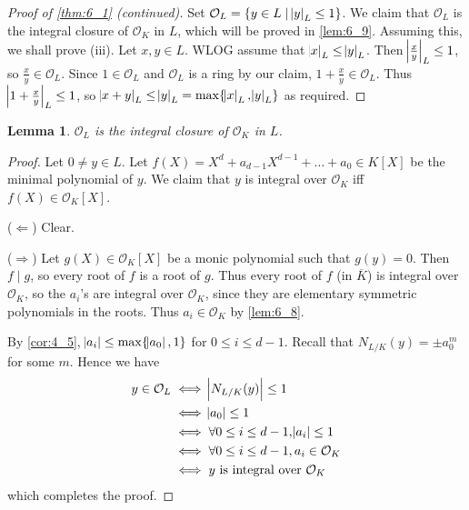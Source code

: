 \documentclass[11pt]{article}
\theoremstyle{definition}
\theoremstyle{plain}
\newtheorem{lemma}[definition]{Lemma}
\theoremstyle{remark}
\renewcommand{\qedsymbol}{$\blacksquare$}
\newcommand{\cO}{\mathcal{O}}
\begin{document}
\begin{proof}[Proof of \autoref{thm:6_1} (continued)]
    Set $\cO_L = \{y \in L \mid \abs{y}_L \le 1\}$. We claim that $\cO_L$ is the integral closure of $\cO_K$ in $L$, which will be proved in \autoref{lem:6_9}. Assuming this, we shall prove (iii). Let $x, y \in L$. WLOG assume that $\abs{x}_L \le \abs{y}_L$. Then $\abs{\frac{x}{y}}_L \le 1$, so $\frac{x}{y} \in \cO_L$. Since $1 \in \cO_L$ and $\cO_L$ is a ring by our claim, $1 + \frac{x}{y} \in \cO_L$. Thus $\abs{1 + \frac{x}{y}}_L \le 1$, so $\abs{x + y}_L \le \abs{y}_L = \max \{\abs{x}_L, \abs{y}_L\}$ as required.
    \renewcommand*{\qedsymbol}{}
\end{proof}

\begin{lemma}\label{lem:6_9}
    $\cO_L$ is the integral closure of $\cO_K$ in $L$.
\end{lemma}
\begin{proof}
    Let $0 \neq y \in L$. Let $f(X) = X^d + a_{d-1} X^{d-1} + \ldots + a_0 \in K[X]$ be the minimal polynomial of $y$. We claim that $y$ is integral over $\cO_K$ iff $f(X) \in \cO_K[X]$.

    \noindent ($\Leftarrow$) Clear.

    \noindent ($\Rightarrow$) Let $g(X) \in \cO_K[X]$ be a monic polynomial such that $g(y) = 0$. Then $f \mid g$, so every root of $f$ is a root of $g$. Thus every root of $f$ (in $\overline{K}$) is integral over $\cO_K$, so the $a_i$'s are integral over $\cO_K$, since they are elementary symmetric polynomials in the roots. Thus $a_i \in \cO_K$ by \autoref{lem:6_8}.

    By \autoref{cor:4_5}, $\abs{a_i} \le \max\{\abs{a_0}, 1\}$ for $0 \le i \le d - 1$. Recall that $N_{L/K}(y) = \pm a_0^m$ for some $m$. Hence we have
    \begin{align*}
        y \in \cO_L
        &\iff \abs{N_{L/K}(y)} \le 1\\
        &\iff \abs{a_0} \le 1\\
        &\iff \forall 0 \le i \le d - 1, \abs{a_i} \le 1\\
        &\iff \forall 0 \le i \le d - 1, a_i \in \cO_K\\
        &\iff y \text{ is integral over } \cO_K
    \end{align*}
    which completes the proof.
\end{proof}
\end{document}
